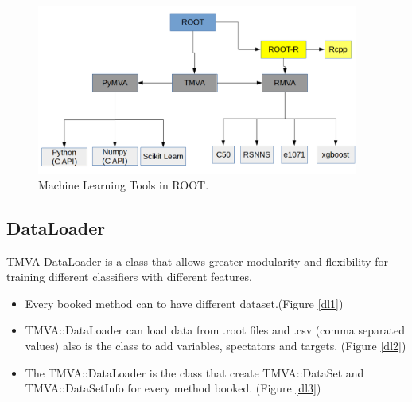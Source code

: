 \documentclass[a4paper]{jpconf}
\begin{document}
\begin{figure}[h]
\centering
\includegraphics[width=25pc]{img/tmva.png}\caption{\label{tmva:label} Machine Learning Tools in ROOT.}
\end{figure}


\subsection{DataLoader}

TMVA DataLoader is a class that allows greater
modularity and flexibility for training different classifiers
with different features.

\begin{itemize}  
\item Every booked method can to have different dataset.(Figure \ref{dl1})
\item TMVA::DataLoader can load data from .root files and .csv (comma separated values) also is the class to add variables, spectators and targets. (Figure \ref{dl2})
\item The TMVA::DataLoader is the class that create TMVA::DataSet and TMVA::DataSetInfo for every method booked. (Figure \ref{dl3})
\end{itemize}
\end{document}
